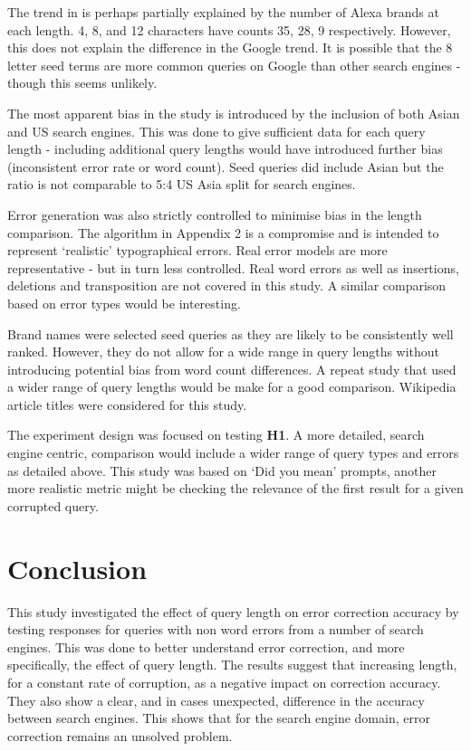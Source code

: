\documentclass{csfourzero}
\begin{document}
The trend in is perhaps partially explained by the number of Alexa brands at each length. 4, 8, and 12 characters have counts 35, 28, 9 respectively. However, this does not explain the difference in the Google trend. It is possible that the 8 letter seed terms are more common queries on Google than other search engines - though this seems unlikely.

The most apparent bias in the study is introduced by the inclusion of both Asian and US search engines. This was done to give sufficient data for each query length - including additional query lengths would have introduced further bias (inconsistent error rate or word count). Seed queries did include Asian but the ratio is not comparable to 5:4 US Asia split for search engines.

Error generation was also strictly controlled to minimise bias in the length comparison. The algorithm in Appendix 2 is a compromise and is intended to represent `realistic' typographical errors. Real error models are more representative - but in turn less controlled. Real word errors as well as insertions, deletions and transposition are not covered in this study. A similar comparison based on error types would be interesting.

Brand names were selected seed queries as they are likely to be consistently well ranked. However, they do not allow for a wide range in query lengths without introducing potential bias from word count differences. A repeat study that used a wider range of query lengths would be make for a good comparison. Wikipedia article titles were considered for this study.

The experiment design was focused on testing \textbf{H1}. A more detailed, search engine centric, comparison would include a wider range of query types and errors as detailed above. This study was based on `Did you mean' prompts, another more realistic metric might be checking the relevance of the first result for a given corrupted query.

\section{Conclusion}
\label{sec:conc}

This study investigated the effect of query length on error correction accuracy by testing responses for queries with non word errors from a number of search engines. This was done to better understand error correction, and more specifically, the effect of query length. The results suggest that increasing length, for a constant rate of corruption, as a negative impact on correction accuracy. They also show a clear, and in cases unexpected, difference in the accuracy between search engines. This shows that for the search engine domain, error correction remains an unsolved problem.
\end{document}
